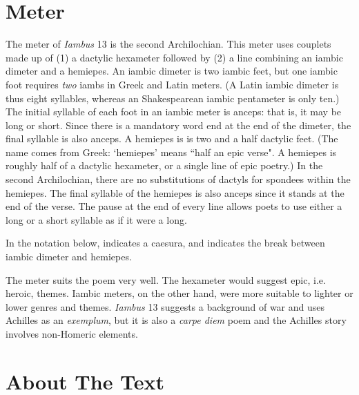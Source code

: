 
\section*{Meter}

The meter of \textit{Iambus} 13 is the second Archilochian. This meter uses couplets made up of (1) a dactylic hexameter followed by (2) a line combining an iambic dimeter and a hemiepes.  An iambic dimeter is two iambic feet, but one iambic foot requires \textit{two} iambs in Greek and Latin meters.  (A Latin iambic dimeter is thus eight syllables, whereas an Shakespearean iambic pentameter is only ten.)  The initial syllable of each foot in an iambic meter is anceps: that is, it may be long or short.  Since there is a mandatory word end at the end of the dimeter, the final syllable is also anceps.  A hemiepes is is two and a half dactylic feet.  (The name comes from Greek: `hemiepes' means ``half an epic verse".  A hemiepes is roughly half of a dactylic hexameter, or a single line of epic poetry.)  In the second Archilochian, there are no substitutions of dactyls for spondees within the hemiepes.  The final syllable of the hemiepes is also anceps since it stands at the end of the verse.  The pause at the end of every line allows poets to use either a long or a short syllable as if it were a long.

In the notation below, \metra{\c} indicates a caesura, and \metra{\cc} indicates the break between iambic dimeter and hemiepes.\newline

\indent\metra{\m\mbb\m\mbb\m\c\mbb\m\mbb\m\mbb\m\mb}

\indent\indent\metra{\mb\m\b\m\mb\m\b\mb\cc\m\bb\m\bb\mb}\newline

The meter suits the poem very well.  The hexameter would suggest epic, i.e.  heroic, themes.  Iambic meters, on the other hand, were more suitable to lighter or lower genres and themes.  \textit{Iambus} 13 suggests a background of war and uses Achilles as an \textit{exemplum}, but it is also a \textit{carpe diem} poem and the Achilles story involves non-Homeric elements.


\section*{About The Text}

